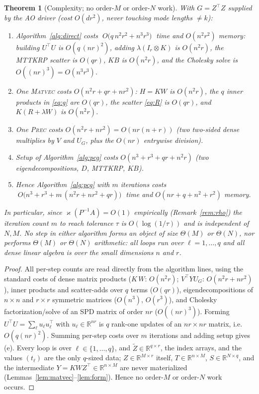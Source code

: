 \documentclass[12pt]{article}
\newcommand{\bR}{\mathbb{R}}
\newtheorem{theorem}{Theorem}
\theoremstyle{remark}
\begin{document}
\begin{theorem}[Complexity; no order-$M$ or order-$N$ work]\label{thm:cost}
With $G=Z^{\!\top}Z$ supplied by the AO driver (cost $O(d r^2)$, never touching mode lengths $\neq k$):
\begin{enumerate}[label=\textup{(\alph*)}, nosep]
  \item Algorithm~\ref{alg:direct} costs
  $\;O\big(q\,n^2 r^2 + n^3 r^3\big)\;$
  time and $O(n^2r^2)$ memory: building $U^{\!\top}U$ is $O(q\,(nr)^2)$, adding $\lambda(I_r\otimes K)$ is $O(n^2r)$, the MTTKRP scatter is $O(qr)$, $KB$ is $O(n^2r)$, and the Cholesky solve is $O((nr)^3)=O(n^3r^3)$.
  \item One \textsc{Matvec} costs $O(n^2 r + q r + n r^2)$: $H=KW$ is $O(n^2r)$, the $q$ inner products in \eqref{eq:g} are $O(qr)$, the scatter \eqref{eq:R} is $O(qr)$, and $K(R+\lambda W)$ is $O(n^2 r)$.
  \item One \textsc{Prec} costs $O(n^2 r + n r^2)=O(nr(n+r))$ (two two-sided dense multiplies by $V$ and $U_G$, plus the $O(nr)$ entrywise division).
  \item Setup of Algorithm~\ref{alg:pcg} costs $O(n^3 + r^3 + q r + n^2 r)$ (two eigendecompositions, $D$, MTTKRP, $KB$).
  \item Hence Algorithm~\ref{alg:pcg} with $m$ iterations costs
  $\;O\big(n^3 + r^3 + m\,(n^2 r + n r^2 + q r)\big)\;$
  time and $O(nr + q + n^2 + r^2)$ memory.
\end{enumerate}
In particular, since $\varkappa(P^{-1}A)=O(1)$ empirically (Remark~\ref{rem:rho}) the iteration count $m$ to reach tolerance $\tau$ is $O(\log(1/\tau))$ and is independent of $N,M$. No step in either algorithm forms an object of size $\Theta(M)$ or $\Theta(N)$, nor performs $\Theta(M)$ or $\Theta(N)$ arithmetic: all loops run over $\ell=1,\dots,q$ and all dense linear algebra is over the small dimensions $n$ and $r$.
\end{theorem}

\begin{proof}
All per-step counts are read directly from the algorithm lines, using the standard costs of dense matrix products ($K\,W$: $O(n^2r)$; $V^{\!\top}YU_G$: $O(n^2r+nr^2)$), inner products and scatter-adds over $q$ terms ($O(qr)$), eigendecompositions of $n\times n$ and $r\times r$ symmetric matrices ($O(n^3)$, $O(r^3)$), and Cholesky factorization/solve of an SPD matrix of order $nr$ ($O((nr)^3)$). Forming $U^{\!\top}U=\sum_\ell u_\ell u_\ell^{\!\top}$ with $u_\ell\in\bR^{nr}$ is $q$ rank-one updates of an $nr\times nr$ matrix, i.e.\ $O(q(nr)^2)$. Summing per-step costs over $m$ iterations and adding setup gives (e). Every loop is over $\ell\in\{1,\dots,q\}$, and $\tilde Z\in\bR^{q\times r}$, the index arrays, and the values $(t_\ell)$ are the only $q$-sized data; $Z\in\bR^{M\times r}$ itself, $T\in\bR^{n\times M}$, $S\in\bR^{N\times q}$, and the intermediate $Y=KWZ^{\!\top}\in\bR^{n\times M}$ are never materialized (Lemmas~\ref{lem:matvec}--\ref{lem:form}). Hence no order-$M$ or order-$N$ work occurs.
\end{proof}
\end{document}

